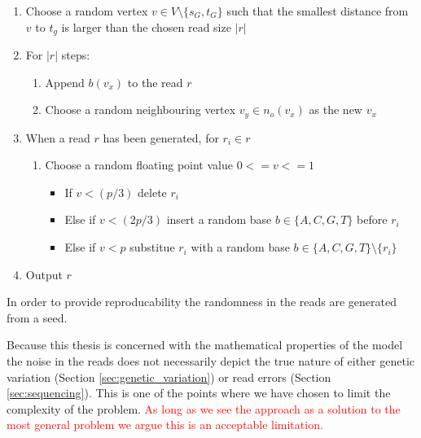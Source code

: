 \documentclass[thesis.tex]{subfiles}
\begin{document}
\begin{enumerate}
  \item Choose a random vertex $v \in V\setminus\{s_G, t_G\}$ such that the smallest distance from $v$ to $t_g$ is larger than the chosen read size $|r|$
  \item For $|r|$ steps:
  \begin{enumerate}
    \item Append $b(v_x)$ to the read $r$
    \item Choose a random neighbouring vertex $v_y \in n_o(v_x)$ as the new $v_x$
  \end{enumerate}
  \item When a read $r$ has been generated, for $r_i \in r$
  \begin{enumerate}
    \item Choose a random floating point value $0<=v<=1$
    \begin{itemize}
      \item If $v<(p/3)$ delete $r_i$
      \item Else if $v<(2p/3)$ insert a random base $b \in \{A, C, G, T\}$ before $r_i$
      \item Else if $v<p$ substitue $r_i$ with a random base $b \in \{A, C, G, T\}\setminus\{r_i\}$
    \end{itemize}
  \end{enumerate}
  \item Output $r$
\end{enumerate}
In order to provide reproducability the randomness in the reads are generated from a seed.\\
\par\noindent
Because this thesis is concerned with the mathematical properties of the model the noise in the reads does not necessarily depict the true nature of either genetic variation (Section \ref{sec:genetic_variation}) or read errors (Section \ref{sec:sequencing}). This is one of the points where we have chosen to limit the complexity of the problem. \textcolor{red}{As long as we see the approach as a solution to the most general problem we argue this is an acceptable limitation.}
\end{document}

